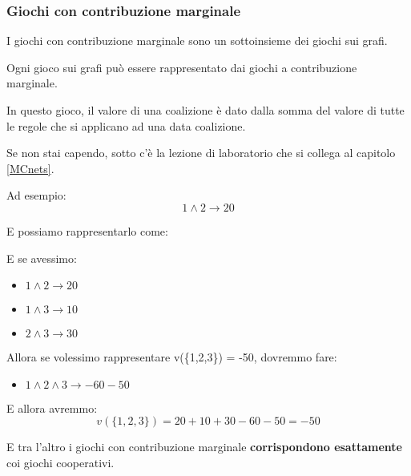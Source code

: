 \subsubsection{Giochi con contribuzione marginale}

I giochi con contribuzione marginale sono un sottoinsieme dei giochi sui grafi.

Ogni gioco sui grafi può essere rappresentato dai giochi a contribuzione
marginale.

In questo gioco, il valore di una coalizione è dato dalla somma del valore di
tutte le regole che si applicano ad una data coalizione.

Se non stai capendo, sotto c'è la lezione di laboratorio che si collega al
capitolo \ref{MCnets}.

Ad esempio:
\[
    1 \land 2 \rightarrow 20
\]

E possiamo rappresentarlo come:
\begin{figure}[H]
    \begin{center}
    \end{center}
\end{figure}

E se avessimo:
\begin{itemize}
    \item  $1 \land 2 \rightarrow 20$
    \item $1 \land 3 \rightarrow 10$
    \item $2 \land 3 \rightarrow 30$
\end{itemize}

Allora se volessimo rappresentare v(\{1,2,3\}) = -50, dovremmo fare:
\begin{itemize}
    \item $1 \land 2 \land 3 \rightarrow -60 - 50$
\end{itemize}

E allora avremmo:
\[
    v(\{1,2,3\}) = 20 +10 +30 -60 -50 = -50
\]

E tra l'altro i giochi con contribuzione marginale \textbf{corrispondono
    esattamente} coi giochi cooperativi.


